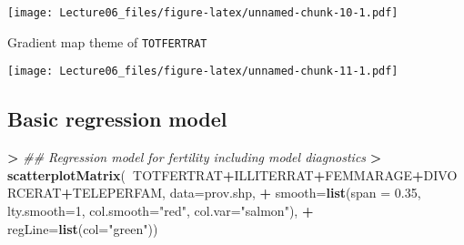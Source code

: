 \documentclass[
]{article}
\newenvironment{Shaded}{\begin{snugshade}}{\end{snugshade}}
\newcommand{\CommentTok}[1]{\textcolor[rgb]{0.56,0.35,0.01}{\textit{#1}}}
\newcommand{\DataTypeTok}[1]{\textcolor[rgb]{0.13,0.29,0.53}{#1}}
\newcommand{\DecValTok}[1]{\textcolor[rgb]{0.00,0.00,0.81}{#1}}
\newcommand{\ErrorTok}[1]{\textcolor[rgb]{0.64,0.00,0.00}{\textbf{#1}}}
\newcommand{\FloatTok}[1]{\textcolor[rgb]{0.00,0.00,0.81}{#1}}
\newcommand{\KeywordTok}[1]{\textcolor[rgb]{0.13,0.29,0.53}{\textbf{#1}}}
\newcommand{\NormalTok}[1]{#1}
\newcommand{\OperatorTok}[1]{\textcolor[rgb]{0.81,0.36,0.00}{\textbf{#1}}}
\newcommand{\StringTok}[1]{\textcolor[rgb]{0.31,0.60,0.02}{#1}}
\begin{document}
\texttt{[image: Lecture06\_files/figure-latex/unnamed-chunk-10-1.pdf]}

Gradient map theme of \texttt{TOTFERTRAT}

\begin{Shaded}
\end{Shaded}

\texttt{[image: Lecture06\_files/figure-latex/unnamed-chunk-11-1.pdf]}

\hypertarget{basic-regression-model}{%
\subsection{Basic regression model}\label{basic-regression-model}}

\begin{Shaded}
\begin{Highlighting}[]
\OperatorTok{>}\StringTok{ }\CommentTok{## Regression model for fertility including model diagnostics}
\ErrorTok{>}\StringTok{ }\KeywordTok{scatterplotMatrix}\NormalTok{(}\OperatorTok{~}\NormalTok{TOTFERTRAT}\OperatorTok{+}\NormalTok{ILLITERRAT}\OperatorTok{+}\NormalTok{FEMMARAGE}\OperatorTok{+}\NormalTok{DIVORCERAT}\OperatorTok{+}\NormalTok{TELEPERFAM, }\DataTypeTok{data=}\NormalTok{prov.shp,}
\OperatorTok{+}\StringTok{                    }\DataTypeTok{smooth=}\KeywordTok{list}\NormalTok{(}\DataTypeTok{span =} \FloatTok{0.35}\NormalTok{, }\DataTypeTok{lty.smooth=}\DecValTok{1}\NormalTok{, }\DataTypeTok{col.smooth=}\StringTok{"red"}\NormalTok{, }\DataTypeTok{col.var=}\StringTok{"salmon"}\NormalTok{),}
\OperatorTok{+}\StringTok{                    }\DataTypeTok{regLine=}\KeywordTok{list}\NormalTok{(}\DataTypeTok{col=}\StringTok{"green"}\NormalTok{))}
\end{Highlighting}
\end{Shaded}
\end{document}
